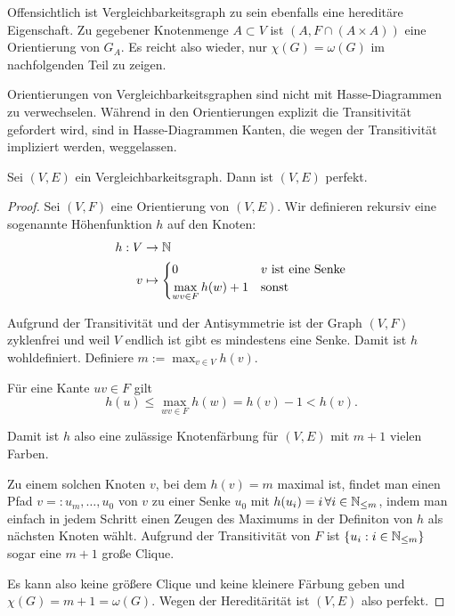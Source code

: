 \documentclass[../main.tex]{subfiles}
\begin{document}
Offensichtlich ist Vergleichbarkeitsgraph zu sein ebenfalls eine hereditäre Eigenschaft. Zu gegebener Knotenmenge $A \subset V$ ist $(A, F \cap (A \times A))$ eine Orientierung von $G_A$. Es reicht also wieder, nur $\chi(G) = \omega(G)$ im nachfolgenden Teil zu zeigen.

\begin{bemerkung}
    Orientierungen von Vergleichbarkeitsgraphen sind nicht mit Hasse-Diagrammen zu verwechselen. Während in den Orientierungen explizit die Transitivität gefordert wird, sind in Hasse-Diagrammen Kanten, die wegen der Transitivität impliziert werden, weggelassen.
\end{bemerkung}


\begin{satz}
    Sei $(V, E)$ ein Vergleichbarkeitsgraph. Dann ist $(V, E)$ perfekt.
\end{satz}
\begin{proof}
    Sei $(V, F)$ eine Orientierung von $(V, E)$. Wir definieren rekursiv eine sogenannte Höhenfunktion $h$ auf den Knoten:
    \begin{align*}
        h : V &\to \mathbb{N} \\
        v &\mapsto \begin{cases}
            0 &v \text{ ist eine Senke}\\
            \max\limits_{wv \in F} h(w) + 1 &\text {sonst}
        \end{cases}
    \end{align*}
    
    Aufgrund der Transitivität und der Antisymmetrie ist der Graph $(V, F)$ zyklenfrei und weil $V$ endlich ist gibt es mindestens eine Senke. Damit ist $h$ wohldefiniert. Definiere $m := \max_{v \in V} h(v)$.

    Für eine Kante $uv \in F$ gilt
    $$h(u) \leq \max\limits_{wv \in F} h(w) = h(v) - 1 < h(v).$$

    Damit ist $h$ also eine zulässige Knotenfärbung für $(V, E)$ mit $m + 1$ vielen Farben.
    
    Zu einem solchen Knoten $v$, bei dem $h(v) = m$ maximal ist, findet man einen Pfad $v =: u_m, \hdots, u_0$ von $v$ zu einer Senke $u_0$ mit $h(u_i) = i\, \forall i \in \mathbb{N}_{\leq m}$, indem man einfach in jedem Schritt einen Zeugen des Maximums in der Definiton von $h$ als nächsten Knoten wählt. Aufgrund der Transitivität von $F$ ist $\{u_i : i \in \mathbb{N}_{\leq m}\}$ sogar eine $m+1$ große Clique.
    
    Es kann also keine größere Clique und keine kleinere Färbung geben und $\chi(G) = m+1 = \omega(G)$. Wegen der Hereditärität ist $(V, E)$ also perfekt.
\end{proof}
\end{document}
